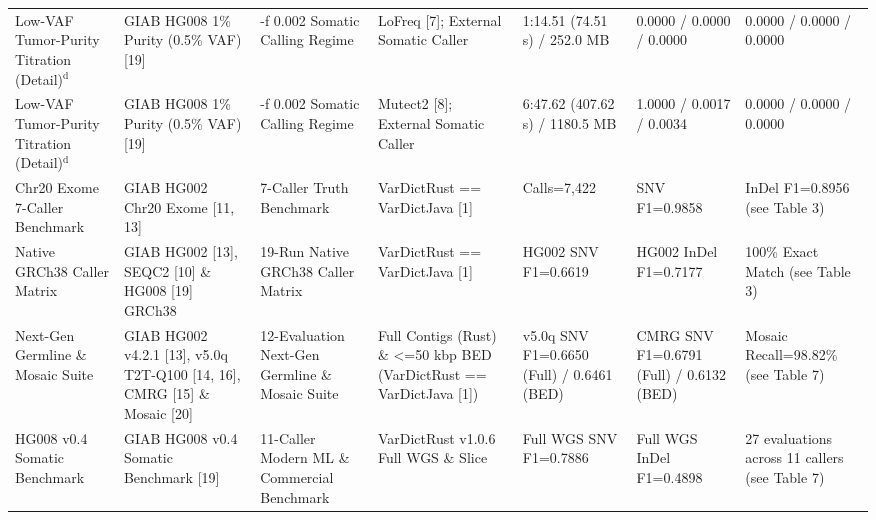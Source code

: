 \begin{table}[htbp]
{\begin{tabular}{lllllll}
Low-VAF Tumor-Purity Titration (Detail)$^{\text{d}}$ & GIAB HG008 1\% Purity (0.5\% VAF) [19] & -f 0.002 Somatic Calling Regime & LoFreq [7]; External Somatic Caller & 1:14.51 (74.51 s) / 252.0 MB & 0.0000 / 0.0000 / 0.0000 & 0.0000 / 0.0000 / 0.0000 \\
Low-VAF Tumor-Purity Titration (Detail)$^{\text{d}}$ & GIAB HG008 1\% Purity (0.5\% VAF) [19] & -f 0.002 Somatic Calling Regime & Mutect2 [8]; External Somatic Caller & 6:47.62 (407.62 s) / 1180.5 MB & 1.0000 / 0.0017 / 0.0034 & 0.0000 / 0.0000 / 0.0000 \\
Chr20 Exome 7-Caller Benchmark & GIAB HG002 Chr20 Exome [11, 13] & 7-Caller Truth Benchmark & VarDictRust == VarDictJava [1] & Calls=7,422 & SNV F1=0.9858 & InDel F1=0.8956 (see Table 3) \\
Native GRCh38 Caller Matrix & GIAB HG002 [13], SEQC2 [10] \& HG008 [19] GRCh38 & 19-Run Native GRCh38 Caller Matrix & VarDictRust == VarDictJava [1] & HG002 SNV F1=0.6619 & HG002 InDel F1=0.7177 & 100\% Exact Match (see Table 3) \\
Next-Gen Germline \& Mosaic Suite & GIAB HG002 v4.2.1 [13], v5.0q T2T-Q100 [14, 16], CMRG [15] \& Mosaic [20] & 12-Evaluation Next-Gen Germline \& Mosaic Suite & Full Contigs (Rust) \& \textless{}=50 kbp BED (VarDictRust == VarDictJava [1]) & v5.0q SNV F1=0.6650 (Full) / 0.6461 (BED) & CMRG SNV F1=0.6791 (Full) / 0.6132 (BED) & Mosaic Recall=98.82\% (see Table 7) \\
HG008 v0.4 Somatic Benchmark & GIAB HG008 v0.4 Somatic Benchmark [19] & 11-Caller Modern ML \& Commercial Benchmark & VarDictRust v1.0.6 Full WGS \& Slice & Full WGS SNV F1=0.7886 & Full WGS InDel F1=0.4898 & 27 evaluations across 11 callers (see Table 7) \\
\hline
\end{tabular}%
}

\end{table}
